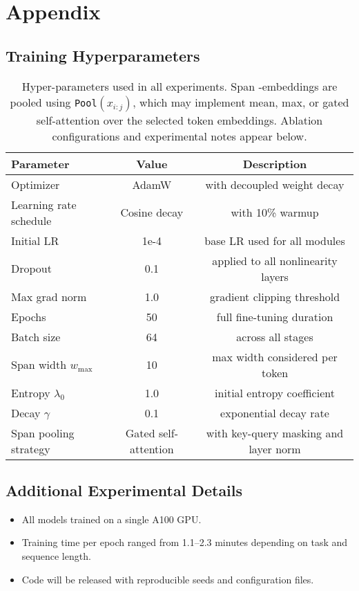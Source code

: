 \appendix
\section*{Appendix}

\subsection{Training Hyperparameters}
\label{sec:hyperparams}

\begin{table}[H]
  \centering
  \begin{tabular}{@{}lcc@{}}
    \toprule
    Parameter & Value & Description \\
    \midrule
    Optimizer & AdamW & with decoupled weight decay \\
    Learning rate schedule & Cosine decay & with 10\% warmup \\
    Initial LR & 1e-4 & base LR used for all modules \\
    Dropout & 0.1 & applied to all nonlinearity layers \\
    Max grad norm & 1.0 & gradient clipping threshold \\
    Epochs & 50 & full fine-tuning duration \\
    Batch size & 64 & across all stages \\
    Span width $w_{\max}$ & 10 & max width considered per token \\
    Entropy $\lambda_0$ & 1.0 & initial entropy coefficient \\
    Decay $\gamma$ & 0.1 & exponential decay rate \\
    Span pooling strategy & Gated self-attention & with key-query masking and layer norm \\
    \bottomrule
  \end{tabular}
  \caption{Hyper-parameters used in all experiments. Span -embeddings are pooled using \texttt{Pool}$(x_{i:j})$, which may implement mean, max, or gated self-attention over the selected token embeddings. Ablation configurations and experimental notes appear below.}
\end{table}

\subsection{Additional Experimental Details}
\label{sec:extra-exp}
\begin{itemize}[leftmargin=1.5em]
    \item All models trained on a single A100 GPU.
    \item Training time per epoch ranged from 1.1–2.3 minutes depending on task and sequence length.
    \item Code will be released with reproducible seeds and configuration files.
\end{itemize}

